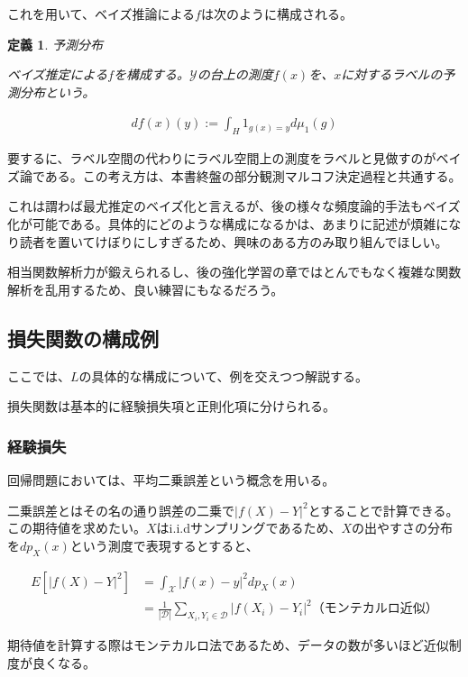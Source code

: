 \documentclass{jsarticle}
\newtheorem{defi}{定義}[section]
\begin{document}
これを用いて、ベイズ推論による$f$は次のように構成される。

\begin{defi} 予測分布

ベイズ推定による$f$を構成する。$\mathcal{Y}$の台上の測度$f(x)$を、$x$に対するラベルの予測分布という。

\begin{align}
df(x)(y):=\int_H 1_{g(x)=y}  d\mu_1(g)
\end{align}

\end{defi}

要するに、ラベル空間の代わりにラベル空間上の測度をラベルと見做すのがベイズ論である。この考え方は、本書終盤の部分観測マルコフ決定過程と共通する。

これは謂わば最尤推定のベイズ化と言えるが、後の様々な頻度論的手法もベイズ化が可能である。具体的にどのような構成になるかは、あまりに記述が煩雑になり読者を置いてけぼりにしすぎるため、興味のある方のみ取り組んでほしい。

相当関数解析力が鍛えられるし、後の強化学習の章ではとんでもなく複雑な関数解析を乱用するため、良い練習にもなるだろう。


\subsection{損失関数の構成例}

ここでは、$L$の具体的な構成について、例を交えつつ解説する。

損失関数は基本的に経験損失項と正則化項に分けられる。


\subsubsection{経験損失}

回帰問題においては、平均二乗誤差という概念を用いる。

二乗誤差とはその名の通り誤差の二乗で$|f(X)-Y|^2$とすることで計算できる。この期待値を求めたい。$X$はi.i.dサンプリングであるため、$X$の出やすさの分布を$dp_X(x)$という測度で表現するとすると、

\begin{align}
E[|f(X)-Y|^2]&=\int_\mathcal{X}|f(x)-y|^2dp_X(x)\\
&=\frac{1}{|\mathcal{D}|}\sum_{X_i,Y_i\in \mathcal{D}} |f(X_i)-Y_i|^2　（モンテカルロ近似）
\end{align}

期待値を計算する際はモンテカルロ法であるため、データの数が多いほど近似制度が良くなる。
\end{document}
